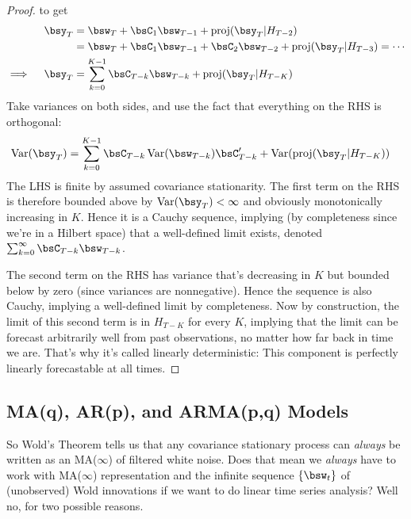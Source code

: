 \documentclass[12pt]{article}
\theoremstyle{plain}
\theoremstyle{definition}
\theoremstyle{remark}
\newcommand{\Var}{\operatorname{Var}}
\newcommand{\proj}{\operatorname{proj}}
\begin{document}
\begin{proof}
to get
\begin{align*}
  \bsy_T
  &=
  \bsw_T + \bsC_1\bsw_{T-1}
  + \proj(\bsy_T|H_{T-2})
  \\
  &=
  \bsw_T + \bsC_1\bsw_{T-1}
  + \bsC_2\bsw_{T-2}
  + \proj(\bsy_T|H_{T-3})
  =\cdots
  \\
  \implies\quad
  \bsy_T
  &=
  \sum_{k=0}^{K-1} \bsC_{T-k}\bsw_{T-k}
  + \proj(\bsy_T|H_{T-K})
\end{align*}
Take variances on both sides, and use the fact that everything on the
RHS is orthogonal:
\begin{align*}
  \Var(\bsy_T)
  &=
  \sum_{k=0}^{K-1} \bsC_{T-k}\Var(\bsw_{T-k})\bsC_{T-k}'
  + \Var(\proj(\bsy_T|H_{T-K}))
\end{align*}
The LHS is finite by assumed covariance stationarity. The first term on
the RHS is therefore bounded above by $\Var(\bsy_T)<\infty$ and
obviously monotonically increasing in $K$. Hence it is a Cauchy
sequence, implying (by completeness since we're in a Hilbert space) that
a well-defined limit exists, denoted
$\sum_{k=0}^\infty \bsC_{T-k}\bsw_{T-k}$.

The second term on the RHS has variance that's decreasing in $K$ but
bounded below by zero (since variances are nonnegative).
Hence the sequence is also Cauchy, implying a well-defined limit by
completeness.
Now by construction, the limit of this second term is in $H_{T-K}$ for
every $K$, implying that the limit can be forecast arbitrarily well from
past observations, no matter how far back in time we are.
That's why it's called linearly deterministic: This component is
perfectly linearly forecastable at all times.
\end{proof}




\clearpage
\subsection{MA(q), AR(p), and ARMA(p,q) Models}

So Wold's Theorem tells us that any covariance stationary process can
\emph{always} be written as an MA($\infty$) of filtered white noise.
Does that mean we \emph{always} have to work with MA($\infty$)
representation and the infinite sequence $\{\bsw_t\}$ of (unobserved)
Wold innovations if we want to do linear time series analysis?
Well no, for two possible reasons.
\end{document}
